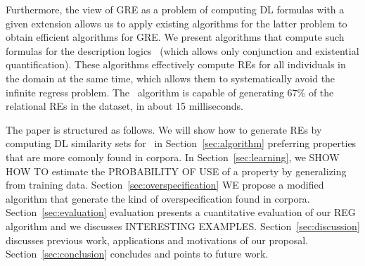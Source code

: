 Furthermore, the view of GRE as a problem of computing DL formulas
with a given extension allows us to apply existing algorithms for the
latter problem to obtain efficient algorithms for GRE.  We present
algorithms that compute such formulas for the description logics \el\
(which allows only conjunction and existential quantification).  These algorithms effectively
compute REs for all individuals in the domain at the same time, which
allows them to systematically avoid the infinite regress problem.  The
\el\ algorithm is capable of generating 67\% of the relational REs in
the \cite{viethen06:_algor_for_gener_refer_expres} dataset, in about
15 milliseconds.  


The paper is structured as follows. We will show how to generate REs by computing DL similarity sets for  \el\ in Section~\ref{sec:algorithm} preferring properties that are more comonly found in corpora.  In Section~\ref{sec:learning}, we SHOW HOW TO estimate the 
PROBABILITY OF USE of a property by generalizing from training data. Section~\ref{sec:overspecification}
WE propose a modified algorithm that generate the kind of overspecification found in corpora. Section~\ref{sec:evaluation} evaluation presents a cuantitative evaluation of our REG algorithm and we discusses INTERESTING EXAMPLES. Section~\ref{sec:discussion} discusses previous work, applications and motivations of our proposal. Section~\ref{sec:conclusion} concludes and points to future work.

